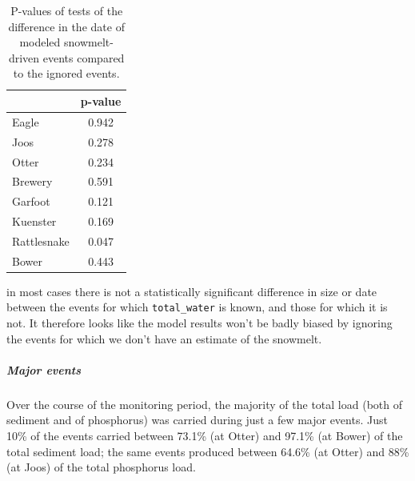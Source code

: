 \documentclass[10pt]{article}
\begin{document}
\begin{table}[ht]
\begin{center}
\begin{tabular}{lc}
  & p-value \\ 
  \hline
Eagle & 0.942 \\ 
  Joos & 0.278 \\ 
  Otter & 0.234 \\ 
  Brewery & 0.591 \\ 
  Garfoot & 0.121 \\ 
  Kuenster & 0.169 \\ 
  Rattlesnake & 0.047 \\ 
  Bower & 0.443 \\ 
  \end{tabular}
\caption{P-values of tests of the difference in the date of modeled snowmelt-driven events compared to the ignored events.}
\label{tab:ignored_test2}
\end{center}
\end{table}
in most cases there is not a statistically significant difference in size or date between the events for which \verb+total_water+ is known, and those for which it is not. It therefore looks like the model results won't be badly biased by ignoring the events for which we don't have an estimate of the snowmelt.\\

\subparagraph{Major events}
Over the course of the monitoring period, the majority of the total load (both of sediment and of phosphorus) was carried during just a few major events. Just 10\% of the events carried between 73.1\% (at Otter) and 97.1\% (at Bower) of the total sediment load; the same events produced between 64.6\% (at Otter) and 88\% (at Joos) of the total phosphorus load.\\
\end{document}
